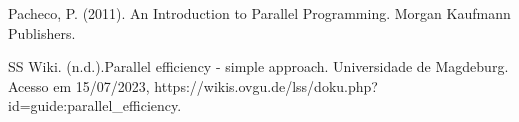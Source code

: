 \documentclass[journal, twoside]{IEEEtran}
\begin{document}






Pacheco, P. (2011). An Introduction to Parallel Programming. Morgan Kaufmann Publishers.

SS Wiki. (n.d.).Parallel efficiency - simple approach. Universidade de Magdeburg. Acesso em 15/07/2023, https://wikis.ovgu.de/lss/doku.php?id=guide:parallel_efficiency.

\ifCLASSOPTIONcaptionsoff
  \newpage
\fi



%
\end{document}

